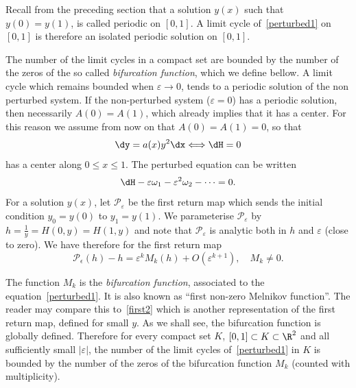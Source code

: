 Recall from the preceding section that a solution $y(x)$ such that $y(0)=y(1)$, is called periodic on $[0,1]$. A limit cycle of~\eqref{perturbed1} on $[0,1]$ is therefore an isolated periodic solution on $[0,1]$.

The number of the limit cycles in a compact set are bounded by the number of the zeros of the so called \emph{bifurcation function}, which we define bellow. A limit cycle which remains bounded when $\varepsilon \to 0$, tends to a periodic solution of the non perturbed system. If the non-perturbed system ($\varepsilon = 0$) has a periodic solution, then necessarily $A(0)=A(1)$, which already implies that it has a center. For this reason we assume from now on that $A(0)=A(1)=0$, so that
\begin{equation*}
\dy = a(x) y^2 \dx \Longleftrightarrow \dH = 0
\end{equation*}
has a center along $0\leq x \leq 1$. The perturbed equation can be written
\begin{equation}\label{perturbed}
\dH - \varepsilon \omega_1 - \varepsilon^2\omega_2 - \dots = 0.
\end{equation}
For a solution $y(x)$, let $\mathcal P_\varepsilon$ be the first return map which sends the initial condition $y_0=y(0)$ to $y_1=y(1)$. We parameterise $\mathcal P_\varepsilon$ by $h=\frac1y = H(0,y)=H(1,y)$ and note that $\mathcal P_\varepsilon$ is analytic both in $h$ and $\varepsilon$ (close to zero). We have therefore for the first return map
\begin{equation}\label{return1}
\mathcal P_\epsilon (h)- h= \varepsilon^k M_k(h) + O(\varepsilon^{k+1}), \quad M_k \neq 0.
\end{equation}

The function $M_k$ is the\emph{ bifurcation function}, associated to the equation~\eqref{perturbed1}. It is also known as ``first non-zero Melnikov function''. The reader may compare this to~\eqref{first2} which is another representation of the first return map, defined for small $y$. As we shall see, the bifurcation function is globally defined. Therefore for every compact set $K$, $[0,1] \subset K \subset \R^2$ and all sufficiently small $|\varepsilon|$, the number of the limit cycles of~\eqref{perturbed1} in $K$ is bounded by the number of the zeros of the bifurcation function $M_k$ (counted with multiplicity).

